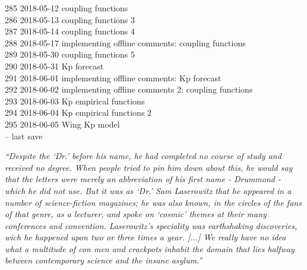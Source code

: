 \begin{footnotesize}
285	2018-05-12	coupling functions\\
286	2018-05-13	coupling functions 3\\
287	2018-05-14	coupling functions 4\\
288	2018-05-17	implementing offline comments: coupling functions\\
289	2018-05-30	coupling functions 5\\
290	2018-05-31	Kp forecast\\
291	2018-06-01	implementing offline comments: Kp forecast\\
292	2018-06-02	implementing offline comments 2: coupling functions\\
293	2018-06-03	Kp empirical functions\\
294	2018-06-04	Kp empirical functions 2\\
295	2018-06-05	Wing Kp model\\
\vspace{\baselineskip}
\ISOToday{} \thistime{} -- last save
\end{footnotesize}


\clearpage


\vspace*{\fill}


\noindent \textit{``Despite the `Dr.' before his name, he had completed no course of study and received no degree. When people tried to pin him down about this, he would say that the letters were merely an abbreviation of his first name - Drummond - which he did not use. But it was as `Dr.' Sam Laserowitz that he appeared in a number of science-fiction magazines; he was also known, in the circles of the fans of that genre, as a lecturer, and spoke on `cosmic' themes at their many conferences and convention. Laserowitz's speciality was earthshaking discoveries, wich he happened upon two or three times a year. [...] We really have no idea what a multitude of con men and crackpots inhabit the domain that lies halfway between contemporary science and the insane asylum.''}
\vspace{\baselineskip}


